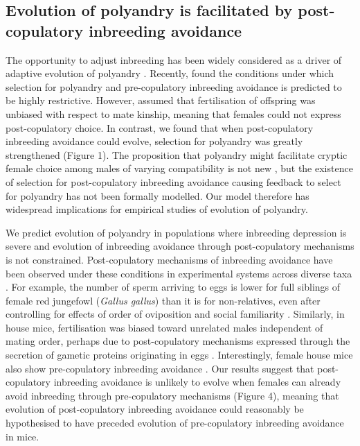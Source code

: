 \documentclass[10pt,letterpaper]{article}
\begin{document}
\subsection*{Evolution of polyandry is facilitated by post-copulatory inbreeding avoidance}

The opportunity to adjust inbreeding has been widely considered as a driver of adaptive evolution of polyandry \cite[][]{Tregenza2002, Foerster2003, Akcay2007, Varian-Ramos2012, Kingma2013, Lehtonen2015, Reid2014}. Recently, \cite{Duthie} found the conditions under which selection for polyandry and pre-copulatory inbreeding avoidance is predicted to be highly restrictive. However, \cite{Duthie} assumed that fertilisation of offspring was unbiased with respect to mate kinship, meaning that females could not express post-copulatory choice. In contrast, we found that when post-copulatory inbreeding avoidance could evolve, selection for polyandry was greatly strengthened (Figure 1). The proposition that polyandry might facilitate cryptic female choice among males of varying compatibility is not new \cite[e.g.,][]{Zeh1997}, but the existence of selection for post-copulatory inbreeding avoidance causing feedback to select for polyandry has not been formally modelled. Our model therefore has widespread implications for empirical studies of evolution of polyandry. 

We predict evolution of polyandry in populations where inbreeding depression is severe and evolution of inbreeding avoidance through post-copulatory mechanisms is not constrained. Post-copulatory mechanisms of inbreeding avoidance have been observed under these conditions in experimental systems across diverse taxa \cite[e.g.,][]{Pizzari2004, Firman2008, Bretman2009, Gasparini2011, Tuni2013, Firman2015}. For example, the number of sperm arriving to eggs is lower for full siblings of female red jungefowl (\textit{Gallus gallus}) than it is for non-relatives, even after controlling for effects of order of oviposition and social familiarity \cite[][]{Pizzari2004}. Similarly, in house mice, fertilisation was biased toward unrelated males independent of mating order, perhaps due to post-copulatory mechanisms expressed through the secretion of gametic proteins originating in eggs \cite[][]{Firman2008, Firman2015}. Interestingly, female house mice also show pre-copulatory inbreeding avoidance  \cite[][]{Potts1991, Roberts2003}. Our results suggest that post-copulatory inbreeding avoidance is unlikely to evolve when females can already avoid inbreeding through pre-copulatory mechanisms (Figure 4), meaning that evolution of post-copulatory inbreeding avoidance could reasonably be hypothesised to have preceded evolution of pre-copulatory inbreeding avoidance in mice. 
\end{document}
